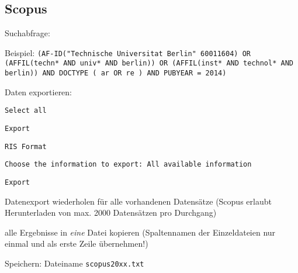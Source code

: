 \subsection*{Scopus}
\begin{compactitem}
\item Suchabfrage: 
	\begin{compactitem}
	\item Beispiel: \texttt{(AF-ID("Technische Universitat Berlin" 60011604) OR \newline(AFFIL(techn* AND univ* AND berlin)) OR (AFFIL(inst* AND technol* AND berlin)) AND  DOCTYPE ( ar  OR  re )  AND  PUBYEAR  =  2014)}
	\end{compactitem}
\item Daten exportieren: 
	\begin{compactitem}
	\item \texttt{Select all}
    \item \texttt{Export}
    \item \texttt{RIS Format}
    \item \texttt{Choose the information to export: All available information}
    \item \texttt{Export}
	\end{compactitem}
\item Datenexport wiederholen für alle vorhandenen Datensätze (Scopus erlaubt Herunterladen von max. 2000 Datensätzen pro Durchgang)
\item alle Ergebnisse in \textit{eine} Datei kopieren (Spaltennamen der Einzeldateien nur einmal und als erste Zeile übernehmen!)
\item Speichern: Dateiname \texttt{scopus20xx.txt}
\end{compactitem}

